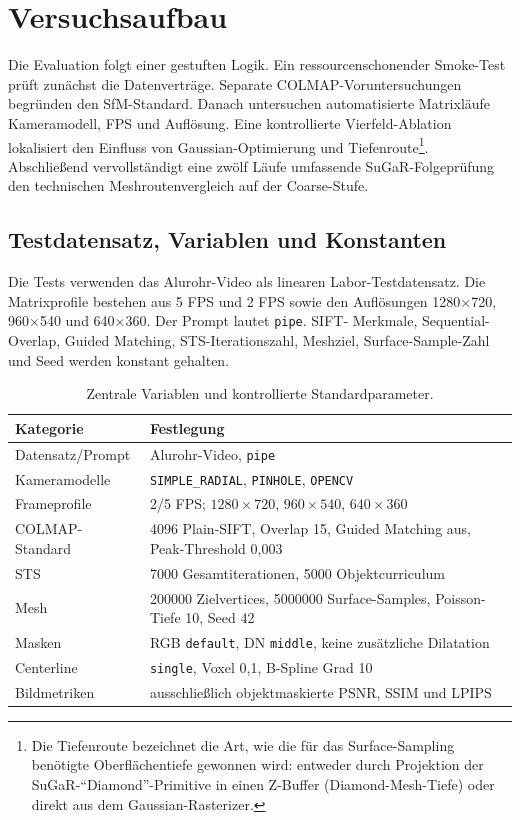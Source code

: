 \section{Versuchsaufbau}
\label{sec:versuchsaufbau}

Die Evaluation folgt einer gestuften Logik. Ein ressourcenschonender
Smoke-Test prüft zunächst die Datenverträge. Separate COLMAP-Voruntersuchungen
begründen den SfM-Standard. Danach untersuchen automatisierte Matrixläufe
Kameramodell, FPS und Auflösung. Eine kontrollierte Vierfeld-Ablation lokalisiert
den Einfluss von Gaussian-Optimierung und Tiefenroute\footnote{Die
Tiefenroute bezeichnet die Art, wie die für das Surface-Sampling benötigte
Oberflächentiefe gewonnen wird: entweder durch Projektion der
SuGaR-``Diamond''-Primitive in einen Z-Buffer (Diamond-Mesh-Tiefe) oder
direkt aus dem Gaussian-Rasterizer.}. Abschließend
vervollständigt eine zwölf Läufe umfassende SuGaR-Folgeprüfung den technischen
Meshroutenvergleich auf der Coarse-Stufe.

\subsection{Testdatensatz, Variablen und Konstanten}

Die Tests verwenden das Alurohr-Video als linearen Labor-Testdatensatz. Die
Matrixprofile bestehen aus 5 FPS und 2 FPS sowie den Auflösungen 1280$\times$720,
960$\times$540 und 640$\times$360. Der Prompt lautet \texttt{pipe}. SIFT-
Merkmale, Sequential-Overlap, Guided Matching, STS-Iterationszahl, Meshziel,
Surface-Sample-Zahl und Seed werden konstant gehalten.

\begin{table}[H]
\centering
\small
\begin{tabularx}{\textwidth}{p{3.5cm}X}
\toprule
Kategorie & Festlegung\\
\midrule
Datensatz/Prompt & Alurohr-Video, \texttt{pipe}\\
Kameramodelle & \texttt{SIMPLE\_RADIAL}, \texttt{PINHOLE}, \texttt{OPENCV}\\
Frameprofile & 2/5 FPS; $1280\times720$, $960\times540$, $640\times360$\\
COLMAP-Standard & 4096 Plain-SIFT, Overlap 15, Guided Matching aus,
Peak-Threshold 0,003\\
STS & 7000 Gesamtiterationen, 5000 Objektcurriculum\\
Mesh & 200000 Zielvertices, 5000000 Surface-Samples, Poisson-Tiefe 10,
Seed 42\\
Masken & RGB \texttt{default}, DN \texttt{middle}, keine zusätzliche
Dilatation\\
Centerline & \texttt{single}, Voxel 0,1, B-Spline Grad 10\\
Bildmetriken & ausschließlich objektmaskierte PSNR, SSIM und LPIPS\\
\bottomrule
\end{tabularx}
\caption{Zentrale Variablen und kontrollierte Standardparameter.}
\label{tab:versuchsparameter}
\end{table}

